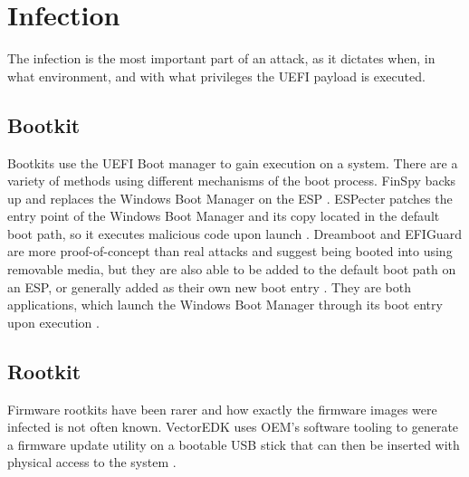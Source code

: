 \section{Infection}
\vspace{-0.5em}

The infection is the most important part of an attack, as it dictates when, in what environment, and with what privileges the \ac{UEFI} payload is executed.

\vspace{-0.5em}
\subsection{Bootkit}
\vspace{-0.5em}

Bootkits use the \ac{UEFI} Boot manager to gain execution on a system.
There are a variety of methods using different mechanisms of the boot process.
FinSpy backs up and replaces the Windows Boot Manager  on the \ac{ESP} \cite{finspy}.
ESPecter patches the entry point of the Windows Boot Manager  and its copy  located in the default boot path, so it executes malicious code upon launch \cite{especter}.
Dreamboot and EFIGuard are more proof-of-concept than real attacks and suggest being booted into using removable media, but they are also able to be added to the default boot path on an \ac{ESP}, or generally added as their own new boot entry \cite{efiguard}.
They are both applications, which launch the Windows Boot Manager through its boot entry upon execution \cite{dreamboot, efiguard}.

\subsection{Rootkit}

Firmware rootkits have been rarer and how exactly the firmware images were infected is not often known.
VectorEDK uses \ac{OEM}'s software tooling to generate a firmware update utility on a bootable \ac{USB} stick that can then be inserted with physical access to the system \cite{mosaicregressor}.

